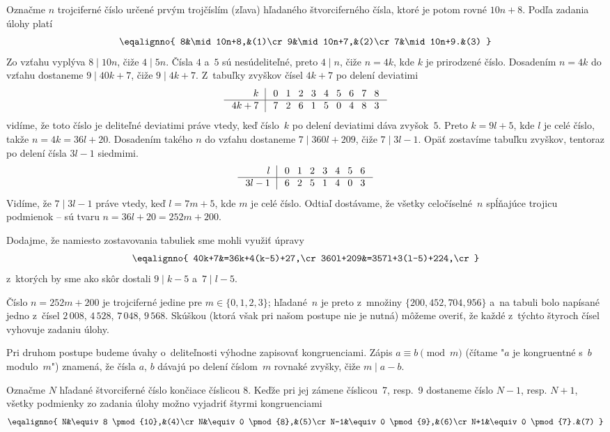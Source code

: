 {%
Označme $n$ trojciferné číslo určené prvým trojčíslím (zľava) hľadaného štvorciferného čísla, ktoré je potom rovné $10n+8$. Podľa zadania úlohy platí
$$
\eqalignno{
 8&\mid 10n+8,&(1)\cr
 9&\mid 10n+7,&(2)\cr
 7&\mid 10n+9.&(3)
}$$
Zo vzťahu  vyplýva $8\mid10n$, čiže $4\mid 5n$. Čísla $4$ a~$5$ sú nesúdeliteľné, preto $4\mid n$, čiže $n=4k$, kde $k$ je prirodzené číslo. Dosadením $n=4k$ do vzťahu  dostaneme $9\mid 40k+7$, čiže $9\mid 4k+7$.
Z~tabuľky zvyškov čísel $4k+7$ po delení deviatimi
$$
\tabskip=8pt\vbox{\offinterlineskip
\halign{\strut\hfil$#$~~\vrule&&\hfil $#$\cr
k&0&1&2&3&4&5&6&7&8\cr
\noalign{\hrule}
4k+7&7&2&6&1&5&0&4&8&3\cr
}}
$$
vidíme, že toto číslo je deliteľné deviatimi práve vtedy, keď číslo~$k$ po delení deviatimi dáva zvyšok~$5$. Preto $k=9l+5$, kde $l$ je celé číslo, takže $n=4k=36l+20$. Dosadením takého $n$ do vzťahu  dostaneme $7\mid 360l+209$, čiže $7\mid 3l-1$. Opäť zostavíme tabuľku zvyškov, tentoraz po delení čísla $3l-1$ siedmimi.
$$
\tabskip=8pt\vbox{\offinterlineskip
\halign{\strut\hfil$#$~~\vrule&&\hfil $#$\cr
l      &0&1&2&3&4&5&6\cr
\noalign{\hrule}
3l-1   &6&2&5&1&4&0&3\cr
}}
$$
Vidíme, že $7\mid 3l-1$ práve vtedy, keď $l=7m+5$, kde $m$ je celé číslo. Odtiaľ dostávame, že všetky celočíselné~$n$ spĺňajúce trojicu podmienok -- sú tvaru $n=36l+20=252m+200$.

Dodajme, že namiesto zostavovania tabuliek sme mohli využiť úpravy
$$
\eqalignno{
40k+7&=36k+4(k-5)+27,\cr
360l+209&=357l+3(l-5)+224,\cr}
$$
z~ktorých by sme ako skôr dostali $9\mid k-5$ a~$7\mid l-5$.

Číslo $n=252m+200$ je trojciferné jedine pre $m\in\{0,1,2,3\}$; hľadané~$n$ je preto z~množiny $\{200,452,704,956\}$ a~na tabuli bolo napísané jedno z~čísel $2\,008$, $4\,528$, $7\,048$, $9\,568$. Skúškou (ktorá však pri našom
postupe nie je nutná) môžeme overiť, že každé z~týchto štyroch čísel vyhovuje zadaniu úlohy.

\ineriesenie
Pri druhom postupe budeme úvahy o~deliteľnosti výhodne zapisovať kongruenciami. Zápis $a\equiv b \pmod{m}$ (čítame "$a$ je kongruentné s~$b$ modulo~$m$") znamená, že čísla $a$, $b$ dávajú po delení číslom~$m$ rovnaké zvyšky, čiže $m\mid a-b$.

Označme $N$ hľadané štvorciferné číslo končiace číslicou 8. Keďže pri jej zámene číslicou~7, resp.~9 dostaneme číslo $N-1$, resp. $N+1$, všetky podmienky zo zadania úlohy možno vyjadriť štyrmi kongruenciami
$$
\eqalignno{
 N&\equiv 8 \pmod{10},&(4)\cr
 N&\equiv 0 \pmod{8},&(5)\cr
 N-1&\equiv 0 \pmod{9},&(6)\cr
 N+1&\equiv 0 \pmod{7}.&(7)
}$$

}
